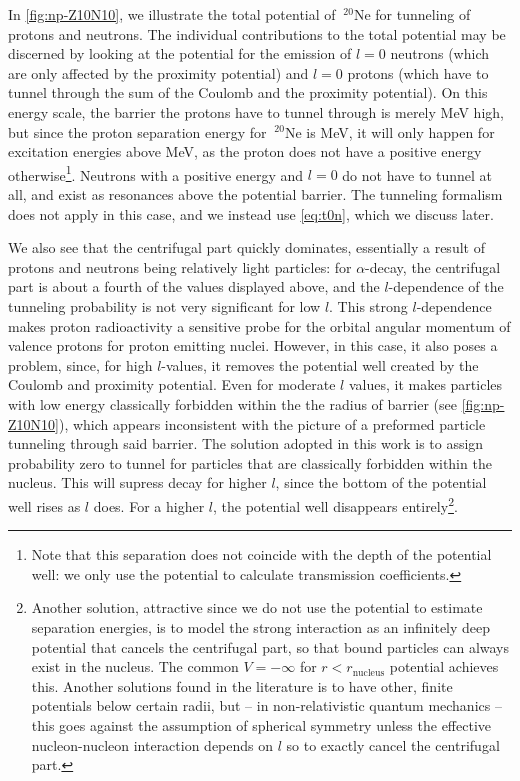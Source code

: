  In \autoref{fig:np-Z10N10}, we illustrate the total potential of $~^{20}\mathrm{Ne}$ for tunneling of protons and neutrons. The individual contributions to the total potential may be discerned by looking at the potential for the emission of $l=0$ neutrons (which are only affected by the proximity potential) and $l=0$ protons (which have to tunnel through the sum of the Coulomb and the proximity potential). %
On this energy scale, the barrier the protons have to tunnel through is merely \unit[2]{MeV} high, but since the proton separation energy for $~^{20}\mathrm{Ne}$ is \unit[12]{MeV}, it will only happen for excitation energies above \unit[12]{MeV}, as the proton does not have a positive energy otherwise\footnote{Note that this separation does not coincide with the depth of the potential well: we only use the potential to calculate transmission coefficients.}. Neutrons with a positive energy and $l=0$ do not have to tunnel at all, and exist as resonances above the potential barrier. The tunneling formalism does not apply in this case, and we instead use \eqref{eq:t0n}, which we discuss later.

We also see that the centrifugal part quickly dominates, essentially a result of protons and neutrons being relatively light particles: for $\alpha$-decay, the centrifugal part is about a fourth of the values displayed above, and the $l$-dependence of the tunneling probability is not very significant for low $l$\cite{weisskopf:1979}.  
This strong $l$-dependence makes proton radioactivity a sensitive probe for the orbital angular momentum of valence protons for proton emitting nuclei\cite{proton-alpha-proxy:2005}. However, in this case, it also poses a problem, since, for high $l$-values, it removes the potential well created by the Coulomb and proximity potential. Even for moderate $l$ values, it makes particles with low energy classically forbidden within the the radius of barrier (see \autoref{fig:np-Z10N10}), which appears inconsistent with the picture of a preformed particle tunneling through said barrier.
The solution adopted in this work is to assign probability zero to tunnel for particles that are classically forbidden within the nucleus. This will supress decay for higher $l$, since the bottom of the potential well rises as $l$ does. For a higher $l$, the potential well disappears entirely\footnote{Another solution, attractive since we do not use the potential to estimate separation energies, is to model the strong interaction as an infinitely deep potential that cancels the centrifugal part, so that bound particles can always exist in the nucleus. The common $V=-\infty$ for $r<r_\text{nucleus}$ potential achieves this. Another solutions found in the literature is to have other, finite potentials below certain radii, but -- in non-relativistic quantum mechanics -- this goes against the assumption of spherical symmetry unless the effective nucleon-nucleon interaction depends on $l$ so to exactly cancel the centrifugal part.}.

